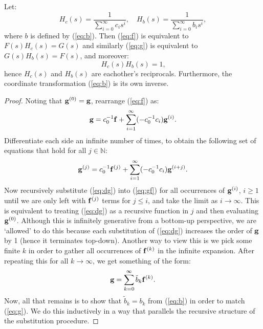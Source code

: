 \begin{corollary}
Let: $$H_c(s) = \frac{1}{\sum_{i=0}^\infty c_i s^i}, \quad H_b(s) = \frac{1}{\sum_{i=0}^\infty b_i s^i}, $$ where $b$ is defined by (\ref{eq:b}). Then (\ref{eq:f}) is equivalent to $F(s)H_c(s) = G(s)$ and similarly (\ref{eq:g}) is equivalent to $G(s)H_b(s) = F(s)$, and moreover:
\begin{equation} \label{eq:inv}
H_c(s) H_b(s) = 1 \text{,}
\end{equation}
hence $H_c(s)$ and $H_b(s)$ are eachother's reciprocals. Furthermore, the coordinate transformation (\ref{eq:b}) is its own inverse.
\end{corollary}

\begin{proof}
Noting that $\mathbf{g}^{(0)} = \mathbf{g}$, rearrange (\ref{eq:f}) as:
\begin{equation} \label{eq:gf}
\mathbf{g} = c_0^{-1} \mathbf{f} + \sum_{i=1}^\infty (-c_0^{-1} c_i) \mathbf{g}^{(i)} \text{.}
\end{equation}
Differentiate each side an infinite number of times, to obtain the following set of equations that hold for all $j \in \mathbb{N}$:
\begin{equation} \label{eq:dg}
\mathbf{g}^{(j)} = c_0^{-1} \mathbf{f}^{(j)} + \sum_{i=1}^\infty (-c_0^{-1} c_i) \mathbf{g}^{(i+j)} \text{.}
\end{equation}
Now recursively substitute (\ref{eq:dg}) into (\ref{eq:gf}) for all occurrences of $\mathbf{g}^{(i)}$, $i \ge 1$ until we are only left with $\mathbf{f}^{(j)}$ terms for $j \le i$, and take the limit as $i \rightarrow \infty$. This is equivalent to treating (\ref{eq:dg}) as a recursive function in $j$ and then evaluating $\mathbf{g}^{(0)}$.
Although this is infinitely generative from a bottom-up perspective, we are `allowed' to do this because each substitution of (\ref{eq:dg}) increases the order of $\mathbf{g}$ by 1 (hence it terminates top-down). Another way to view this is we pick some finite $k$ in order to gather all occurrences of $\mathbf{f}^{(k)}$ in the infinite expansion. After repeating this for all $k \rightarrow \infty$, we get something of the form:
\begin{equation*}
\mathbf{g} = \sum_{k=0}^\infty \tilde{b}_k \mathbf{f}^{(k)} \text{.}
\end{equation*}
Now, all that remains is to show that $\tilde{b}_k = b_k$ from (\ref{eq:b}) in order to match (\ref{eq:g}). We do this inductively in a way that parallels the recursive structure of the substitution procedure.


\end{proof}
